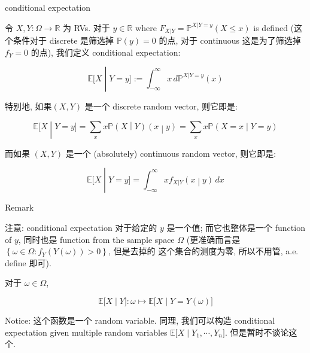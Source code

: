 \documentclass{qlnotes-export}
\begin{document}
\begin{definition}{conditional expectation}\label{def-03-joint-conditional-distribution-conditional-expectation}

令 \(X,Y:\Omega\rightarrow{\mathbb{R}}\) 为 RVs. 对于 \(y \in {\mathbb{R}}\) where \(F_{X|Y} = {\mathbb{P}}^{X|Y = y}(X \leq x)\) is defined (这个条件对于 discrete 是筛选掉 \({\mathbb{P}}(y) = 0\) 的点, 对于 continuous 这是为了筛选掉 \(f_{Y} = 0\) 的点), 我们定义 conditional expectation:

\[\left. {\mathbb{E}}\lbrack X \middle| Y = y\rbrack := \int_{- \infty}^{\infty}x\, d{\mathbb{P}}^{X|Y = y}(x) \right.\]

特别地, 如果\((X,Y)\) 是一个 discrete random vector, 则它即是:

\[\left. {\mathbb{E}}\lbrack X \middle| Y = y\rbrack = \sum\limits_{x}x{\mathbb{P}}(X \middle| Y)(x \middle| y) = \sum\limits_{x}x{\mathbb{P}}(X = x \middle| Y = y) \right.\]

而如果 \((X,Y)\) 是一个 (absolutely) continuous random vector, 则它即是:

\[\left. {\mathbb{E}}\lbrack X \middle| Y = y\rbrack = \int_{- \infty}^{\infty}xf_{X|Y}(x \middle| y)\, dx \right.\]

\end{definition}

\begin{qlremark}{Remark}

注意: conditional expectation 对于给定的 \(y\) 是一个值; 而它也整体是一个 function of \(y\), 同时也是 function from the sample space \(\Omega\) (更准确而言是 \(\left\{ {\omega \in \Omega:f_{Y}(Y(\omega)) > 0} \right\}\), 但是去掉的 这个集合的测度为零, 所以不用管, a.e. define 即可).

对于 \(\omega \in \Omega\),

\[\left. {\mathbb{E}}\lbrack X \middle| Y\rbrack:\omega\mapsto{\mathbb{E}}\lbrack X \middle| Y = Y(\omega)\rbrack \right.\]

Notice: 这个函数是一个 random variable. 同理, 我们可以构造 conditional expectation given multiple random variables \(\left. {\mathbb{E}}\lbrack X \middle| Y_{1},\cdots,Y_{n}\rbrack \right.\). 但是暂时不谈论这个.

\end{qlremark}
\end{document}
